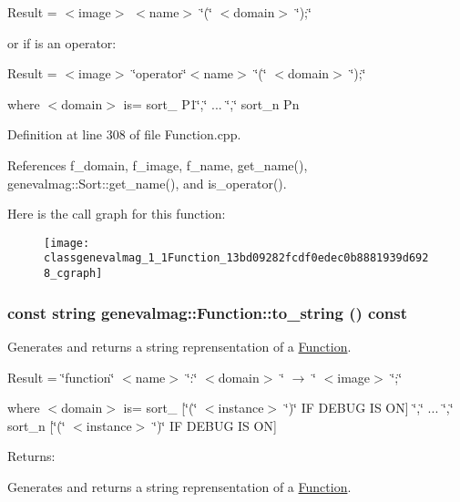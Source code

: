 Result = $<$image$>$ $<$name$>$ \char`\"{}(\char`\"{} $<$domain$>$ \char`\"{});\char`\"{}

or if is an operator:

Result = $<$image$>$ \char`\"{}operator\char`\"{}$<$name$>$ \char`\"{}(\char`\"{} $<$domain$>$ \char`\"{});\char`\"{}

where $<$domain$>$ is= sort\_ P1\char`\"{},\char`\"{} ... \char`\"{},\char`\"{} sort\_\-n Pn 

Definition at line 308 of file Function.cpp.

References f\_\-domain, f\_\-image, f\_\-name, get\_\-name(), genevalmag::Sort::get\_\-name(), and is\_\-operator().

Here is the call graph for this function:\nopagebreak
\begin{figure}[H]
\begin{center}
\leavevmode
\texttt{[image: classgenevalmag\_1\_1Function\_13bd09282fcdf0edec0b8881939d6928\_cgraph]}
\end{center}
\end{figure}
\hypertarget{classgenevalmag_1_1Function_e730b6f7f0108383e1acbdde13813585}{
\subsubsection[{to\_\-string}]{\setlength{\rightskip}{0pt plus 5cm}const string genevalmag::Function::to\_\-string () const}}
\label{classgenevalmag_1_1Function_e730b6f7f0108383e1acbdde13813585}


Generates and returns a string reprensentation of a \hyperlink{classgenevalmag_1_1Function}{Function}.\par
 \par
 Result = \char`\"{}function\char`\"{} $<$name$>$ \char`\"{}:\char`\"{} $<$domain$>$ \char`\"{} $\rightarrow$ \char`\"{} $<$image$>$ \char`\"{};\char`\"{}\par
 \par
 where $<$domain$>$ is= sort\_ \mbox{[}\char`\"{}(\char`\"{} $<$instance$>$ \char`\"{})\char`\"{} IF DEBUG IS ON\mbox{]} \char`\"{},\char`\"{} ... \char`\"{},\char`\"{} sort\_\-n \mbox{[}\char`\"{}(\char`\"{} $<$instance$>$ \char`\"{})\char`\"{} IF DEBUG IS ON\mbox{]}\par


\begin{Desc}
\item[Returns:]\end{Desc}
Generates and returns a string reprensentation of a \hyperlink{classgenevalmag_1_1Function}{Function}.

